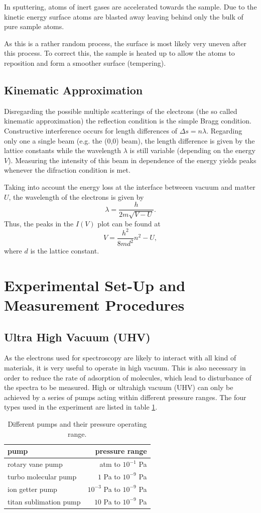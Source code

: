 \documentclass[a4paper]{scrartcl}
\numberwithin{equation}{section}
\numberwithin{figure}{section}
\numberwithin{table}{section}
\newcommand{\eq}[2]{\begin{equation}#1\label{#2}\end{equation}}
\begin{document}
In sputtering, atoms of inert gases are accelerated towards the sample. Due to the kinetic energy surface atoms are blasted away leaving behind only the bulk of pure sample atoms.

As this is a rather random process, the surface is most likely very uneven after this process. To correct this, the sample is heated up to allow the atoms to reposition and form a smoother surface (tempering).


\subsection{Kinematic Approximation}
Disregarding the possible multiple scatterings of the electrons (the so called kinematic approximation) the reflection condition is the simple Bragg condition. Constructive interference occurs for length differences of $\Delta s = n\lambda$. Regarding only one a single beam (e.g. the (0,0) beam), the length difference is given by the lattice constants while the wavelength $\lambda$ is still variable (depending on the energy $V$). Measuring the intensity of this beam in dependence of the energy yields peaks whenever the difraction condition is met.

Taking into account the energy loss at the interface betweeen vacuum and matter $U$, the wavelength of the electrons is given by
\eq{\lambda = \frac{h}{2m\sqrt{V-U}}.}{}
Thus, the peaks in the $I(V)$ plot can be found at
\eq{V=\frac{h^2}{8md^2}n^2-U,}{}
where $d$ is the lattice constant.


\section{Experimental Set-Up and Measurement Procedures}


\subsection{Ultra High Vacuum (UHV)}
As the electrons used for spectroscopy are likely to interact with all kind of materials, it is very useful to operate in high vacuum. This is also necessary in order to reduce the rate of adsorption of molecules, which lead to disturbance of the spectra to be measured. High or ultrahigh vacuum (UHV) can only be achieved by a series of pumps acting within different pressure ranges. The four types used in the experiment are listed in table \ref{tab:pump}.
\begin{table}
\centering
\begin{tabular}{lr}
\toprule
pump & pressure range \\
\midrule
rotary vane pump & atm to $10^{-1}$ Pa \\
turbo molecular pump &  $1$ Pa to $10^{-9}$ Pa \\
ion getter pump  & $ 10^{-3}$ Pa to $10^{-9}$ Pa \\
titan sublimation pump & $10$ Pa to $10^{-9}$ Pa \\
\bottomrule
\end{tabular}
\caption{Different pumps and their pressure operating range.}
\label{tab:pump}
\end{table}
\end{document}
